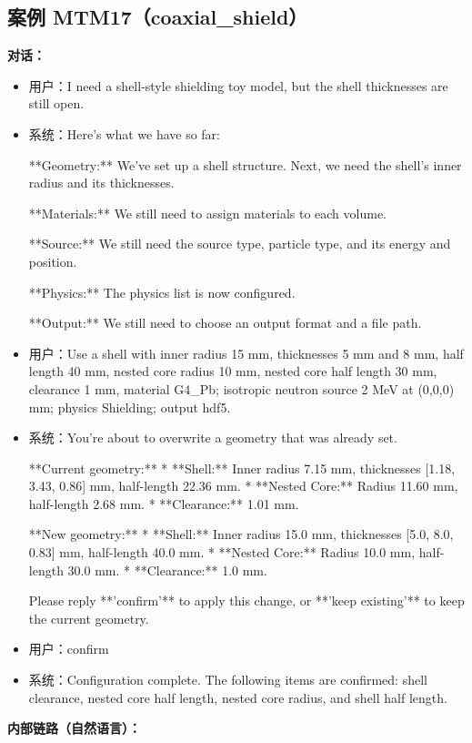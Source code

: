 \documentclass[11pt]{ctexart}
\begin{document}
\subsection{案例 MTM17（coaxial\_shield）}
\textbf{对话：}
\begin{itemize}
\item 用户：I need a shell-style shielding toy model, but the shell thicknesses are still open.
\item 系统：Here's what we have so far:

**Geometry:** We've set up a shell structure. Next, we need the shell's inner radius and its thicknesses.

**Materials:** We still need to assign materials to each volume.

**Source:** We still need the source type, particle type, and its energy and position.

**Physics:** The physics list is now configured.

**Output:** We still need to choose an output format and a file path.
\item 用户：Use a shell with inner radius 15 mm, thicknesses 5 mm and 8 mm, half length 40 mm, nested core radius 10 mm, nested core half length 30 mm, clearance 1 mm, material G4\_Pb; isotropic neutron source 2 MeV at (0,0,0) mm; physics Shielding; output hdf5.
\item 系统：You're about to overwrite a geometry that was already set.

**Current geometry:**
*   **Shell:** Inner radius 7.15 mm, thicknesses [1.18, 3.43, 0.86] mm, half-length 22.36 mm.
*   **Nested Core:** Radius 11.60 mm, half-length 2.68 mm.
*   **Clearance:** 1.01 mm.

**New geometry:**
*   **Shell:** Inner radius 15.0 mm, thicknesses [5.0, 8.0, 0.83] mm, half-length 40.0 mm.
*   **Nested Core:** Radius 10.0 mm, half-length 30.0 mm.
*   **Clearance:** 1.0 mm.

Please reply **'confirm'** to apply this change, or **'keep existing'** to keep the current geometry.
\item 用户：confirm
\item 系统：Configuration complete. The following items are confirmed: shell clearance, nested core half length, nested core radius, and shell half length.
\end{itemize}
\textbf{内部链路（自然语言）：}
\end{document}
